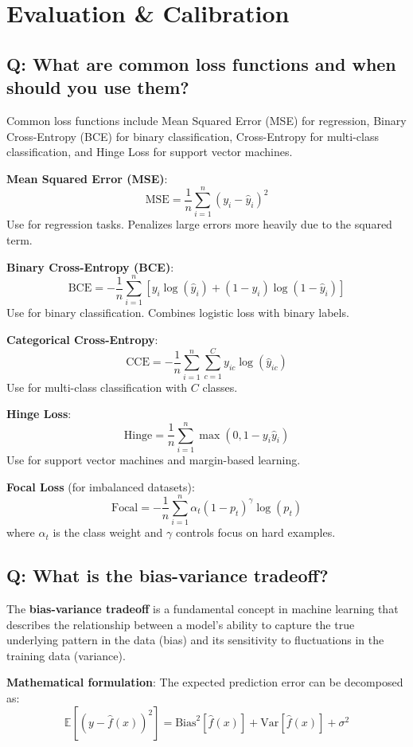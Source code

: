 \section{Evaluation \& Calibration}

\subsection*{Q: What are common loss functions and when should you use them?}
Common loss functions include Mean Squared Error (MSE) for regression, Binary Cross-Entropy (BCE) for binary classification, Cross-Entropy for multi-class classification, and Hinge Loss for support vector machines.

\textbf{Mean Squared Error (MSE)}:
\[
	\text{MSE} = \frac{1}{n} \sum_{i=1}^{n} (y_i - \hat{y}_i)^2
\]
Use for regression tasks. Penalizes large errors more heavily due to the squared term.

\textbf{Binary Cross-Entropy (BCE)}:
\[
	\text{BCE} = -\frac{1}{n} \sum_{i=1}^{n} [y_i \log(\hat{y}_i) + (1-y_i) \log(1-\hat{y}_i)]
\]
Use for binary classification. Combines logistic loss with binary labels.

\textbf{Categorical Cross-Entropy}:
\[
	\text{CCE} = -\frac{1}{n} \sum_{i=1}^{n} \sum_{c=1}^{C} y_{ic} \log(\hat{y}_{ic})
\]
Use for multi-class classification with \(C\) classes.

\textbf{Hinge Loss}:
\[
	\text{Hinge} = \frac{1}{n} \sum_{i=1}^{n} \max(0, 1 - y_i \hat{y}_i)
\]
Use for support vector machines and margin-based learning.

\textbf{Focal Loss} (for imbalanced datasets):
\[
	\text{Focal} = -\frac{1}{n} \sum_{i=1}^{n} \alpha_t (1-p_t)^\gamma \log(p_t)
\]
where \(\alpha_t\) is the class weight and \(\gamma\) controls focus on hard examples.

\subsection*{Q: What is the bias-variance tradeoff?}
The \textbf{bias-variance tradeoff} is a fundamental concept in machine learning that describes the relationship between a model's ability to capture the true underlying pattern in the data (bias) and its sensitivity to fluctuations in the training data (variance).

\textbf{Mathematical formulation}:
The expected prediction error can be decomposed as:
\[
	\mathbb{E}[(y - \hat{f}(x))^2] = \text{Bias}^2[\hat{f}(x)] + \text{Var}[\hat{f}(x)] + \sigma^2
\]

